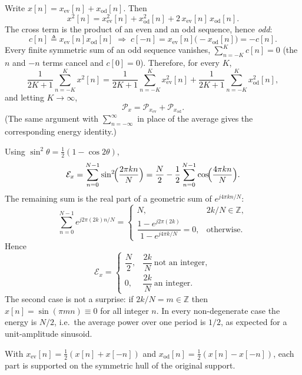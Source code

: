 
Write $x[n]=x_{\mathrm{ev}}[n]+x_{\mathrm{od}}[n]$. Then
\[
x^2[n]=x_{\mathrm{ev}}^2[n]+x_{\mathrm{od}}^2[n]+2\,x_{\mathrm{ev}}[n]\,x_{\mathrm{od}}[n].
\]
The cross term is the product of an even and an odd sequence, hence \emph{odd}:
\[
c[n]\triangleq x_{\mathrm{ev}}[n]x_{\mathrm{od}}[n]
\;\Longrightarrow\;
c[-n]=x_{\mathrm{ev}}[n]\bigl(-x_{\mathrm{od}}[n]\bigr)=-c[n].
\]
Every finite symmetric sum of an odd sequence vanishes,
$\sum_{n=-K}^{K}c[n]=0$ (the $n$ and $-n$ terms cancel and $c[0]=0$). Therefore, for every $K$,
\[
\frac{1}{2K+1}\sum_{n=-K}^{K}x^{2}[n]
=\frac{1}{2K+1}\sum_{n=-K}^{K}x_{\mathrm{ev}}^{2}[n]
+\frac{1}{2K+1}\sum_{n=-K}^{K}x_{\mathrm{od}}^{2}[n],
\]
and letting $K\to\infty$,
\[
\boxed{\;\mathcal{P}_x=\mathcal{P}_{x_{\mathrm{ev}}}+\mathcal{P}_{x_{\mathrm{od}}} .\;}
\]
(The same argument with $\sum_{n=-\infty}^{\infty}$ in place of the average gives the
corresponding energy identity.)


Using $\sin^{2}\theta=\tfrac12(1-\cos 2\theta)$,
\[
\mathcal{E}_x=\sum_{n=0}^{N-1}\sin^{2}\!\Bigl(\frac{2\pi kn}{N}\Bigr)
=\frac{N}{2}-\frac12\sum_{n=0}^{N-1}\cos\!\Bigl(\frac{4\pi kn}{N}\Bigr).
\]
The remaining sum is the real part of a geometric sum of $e^{j4\pi kn/N}$:
\[
\sum_{n=0}^{N-1}e^{j2\pi(2k)n/N}=
\begin{cases}
N, & 2k/N\in\mathbb{Z},\\[2pt]
\dfrac{1-e^{j2\pi(2k)}}{1-e^{j4\pi k/N}}=0, & \text{otherwise.}
\end{cases}
\]
Hence
\[
\boxed{\;
\mathcal{E}_x=
\begin{cases}
\dfrac{N}{2}, & \dfrac{2k}{N}\ \text{not an integer},\\[8pt]
0, & \dfrac{2k}{N}\ \text{an integer}.
\end{cases}\;}
\]
The second case is not a surprise: if $2k/N=m\in\mathbb{Z}$ then
$x[n]=\sin(\pi m n)\equiv 0$ for all integer $n$. In every non-degenerate case the energy is
$N/2$, i.e.\ the average power over one period is $1/2$, as expected for a unit-amplitude
sinusoid.


With $x_{\mathrm{ev}}[n]=\tfrac12(x[n]+x[-n])$ and $x_{\mathrm{od}}[n]=\tfrac12(x[n]-x[-n])$,
each part is supported on the symmetric hull of the original support.

